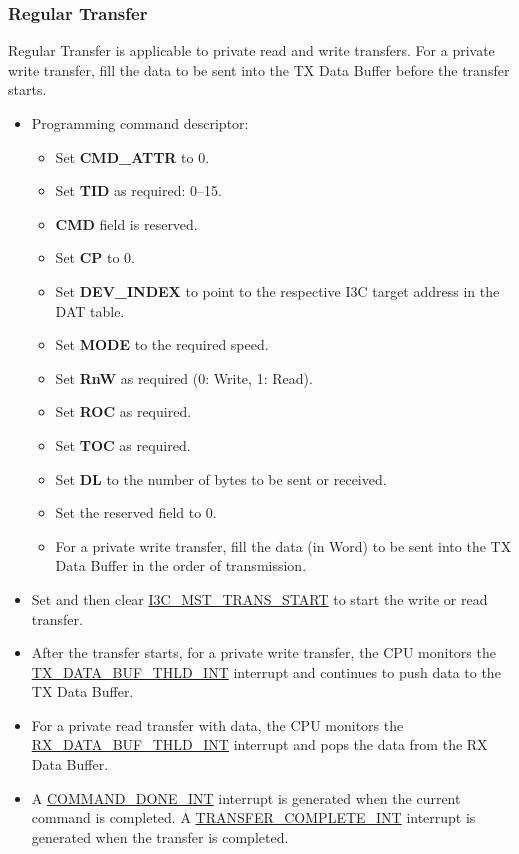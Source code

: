 \documentclass[main\_\_EN.tex]{subfiles}
\begin{document}
\subsubsection{Regular Transfer}
Regular Transfer is applicable to private read and write transfers. For a private write transfer, fill the data to be sent into the TX Data Buffer before the transfer starts.

\begin{itemize}
    \item Programming command descriptor:
    \begin{itemize}
        \item Set \textbf{CMD\_ATTR} to 0.
        \item Set \textbf{TID} as required: 0–15.
        \item \textbf{CMD} field is reserved.
        \item Set \textbf{CP} to 0.
        \item Set \textbf{DEV\_INDEX} to point to the respective I3C target address in the DAT table.
        \item Set \textbf{MODE} to the required speed.
        \item Set \textbf{RnW} as required (0: Write, 1: Read).
        \item Set \textbf{ROC} as required.
        \item Set \textbf{TOC} as required.
        \item Set \textbf{DL} to the number of bytes to be sent or received.
        \item Set the reserved field to 0.
        \item For a private write transfer, fill the data (in Word) to be sent into the TX Data Buffer in the order of transmission.
    \end{itemize}
    \item Set and then clear \hyperref[fielddesc:I3CMSTREGTRANSSTART]{I3C\_MST\_TRANS\_START} to start the write or read transfer.
    \item After the transfer starts, for a private write transfer, the CPU monitors the \hyperref[int:TXDATABUFTHLDINT]{TX\_DATA\_BUF\_THLD\_INT} interrupt and continues to push data to the TX Data Buffer.
    \item For a private read transfer with data, the CPU monitors the \hyperref[int:RXDATABUFTHLDINT]{RX\_DATA\_BUF\_THLD\_INT} interrupt and pops the data from the RX Data Buffer.
    \item A \hyperref[int:COMMANDDONEINT]{COMMAND\_DONE\_INT} interrupt is generated when the current command is completed. A \hyperref[int:TRANSFERCOMPLETEINT]{TRANSFER\_COMPLETE\_INT} interrupt is generated when the transfer is completed.

\end{itemize}
\end{document}
